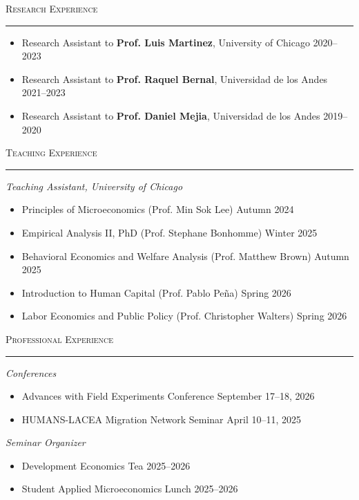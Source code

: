 \documentclass[10pt, letterpaper]{article}
\newcommand{\cvsection}[1]{%
  \vspace{14pt}%
  {\color{accent}\large\scshape #1}%
  \par\vspace{-2pt}%
  {\color{accent}\rule{\linewidth}{1.5pt}}%
  \par\vspace{6pt}%
}
\newcommand{\cvsubsection}[1]{%
  \vspace{6pt}%
  {\color{accent}\normalsize\itshape #1}%
  \par\vspace{3pt}%
}
\begin{document}
\cvsection{Research Experience}

\begin{itemize}
  \item Research Assistant to \textbf{Prof. Luis Martinez}, University of Chicago \hfill 2020--2023
  \item Research Assistant to \textbf{Prof. Raquel Bernal}, Universidad de los Andes \hfill 2021--2023
  \item Research Assistant to \textbf{Prof. Daniel Mejia}, Universidad de los Andes \hfill 2019--2020
\end{itemize}

\cvsection{Teaching Experience}

{\itshape Teaching Assistant, University of Chicago}

\begin{itemize}
  \item Principles of Microeconomics (Prof. Min Sok Lee) \hfill Autumn 2024
  \item Empirical Analysis II, PhD (Prof. Stephane Bonhomme) \hfill Winter 2025
  \item Behavioral Economics and Welfare Analysis (Prof. Matthew Brown) \hfill Autumn 2025
  \item Introduction to Human Capital (Prof. Pablo Peña) \hfill Spring 2026
  \item Labor Economics and Public Policy (Prof. Christopher Walters) \hfill Spring 2026
\end{itemize}

\newpage

\cvsection{Professional Experience}

\cvsubsection{Conferences}

\begin{itemize}[topsep=0pt, partopsep=0pt]
  \item Advances with Field Experiments Conference \hfill September 17--18, 2026
  \item HUMANS-LACEA Migration Network Seminar \hfill April 10--11, 2025
\end{itemize}

\cvsubsection{Seminar Organizer}

\begin{itemize}[topsep=0pt, partopsep=0pt]
  \item Development Economics Tea \hfill 2025--2026
  \item Student Applied Microeconomics Lunch \hfill 2025--2026
\end{itemize}
\end{document}
